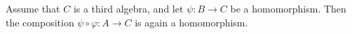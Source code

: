 Assume that $C$ is a third algebra, and let $\psi : B \rightarrow C$ be a homomorphism. Then the composition $\psi \circ \varphi : A \rightarrow C$ is again a homomorphism.
